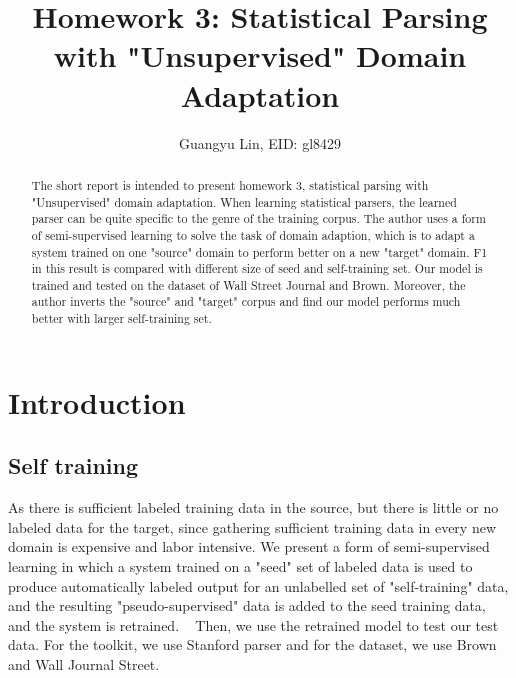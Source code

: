 \documentclass[journal, a4paper]{IEEEtran}
\begin{document}
	\title{Homework 3: Statistical Parsing with "Unsupervised" Domain Adaptation}
	\author{Guangyu Lin, EID: gl8429
}
	\maketitle

\begin{abstract}
	The short report is intended to present homework 3, statistical parsing with "Unsupervised" domain adaptation. When learning statistical parsers, the learned parser can be quite specific to the genre of the training corpus. The author uses a form of semi-supervised learning to solve the task of domain adaption, which is to adapt a system trained on one "source" domain to perform better on a new "target" domain. F1 in this result is compared with different size of seed and self-training set. Our model is trained and tested on the dataset of Wall Street Journal and Brown. Moreover, the author inverts the "source" and "target" corpus and find our model performs much better with larger self-training set.
	
\end{abstract}

\section{Introduction}
\subsection{Self training}

As there is sufficient labeled training data in the source, but there is little or no labeled data for the target, since gathering sufficient training data in every new domain is expensive and labor intensive. We present a form of semi-supervised learning in which a system trained on a "seed" set of labeled data is used to produce automatically labeled output for an unlabelled set of "self-training" data, and the resulting "pseudo-supervised" data is added to the seed training data, and the system is retrained. ~\cite{WEB} Then, we use the retrained model to test our test data. For the toolkit, we use Stanford parser and for the dataset, we use Brown and Wall Journal Street.
\end{document}
